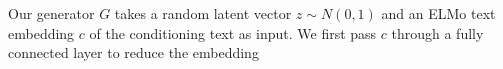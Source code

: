 Our generator $G$ takes a random latent vector $z \sim N(0, 1)$ and an ELMo text embedding $c$ of the conditioning text as input. We first pass $c$ through a fully connected layer to reduce the embedding 